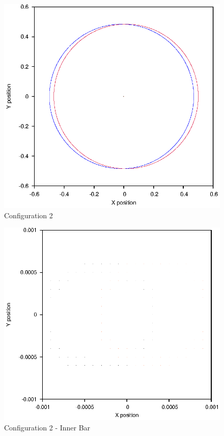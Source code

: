 \documentclass[a4paper,12pt]{article}
\begin{document}
\begin{figure}[H]
\centering
\includegraphics[width=.9\textwidth]{./2016results/002-5-001/Orbit.eps}
\caption{Configuration 2}
\label{fig:config2}
\end{figure}

\begin{figure}[H]
\centering
\includegraphics[width=.9\textwidth]{./2016results/002-5-001/Inner.eps}
\caption{Configuration 2 - Inner Bar}
\label{fig:config2i}
\end{figure}
\end{document}
